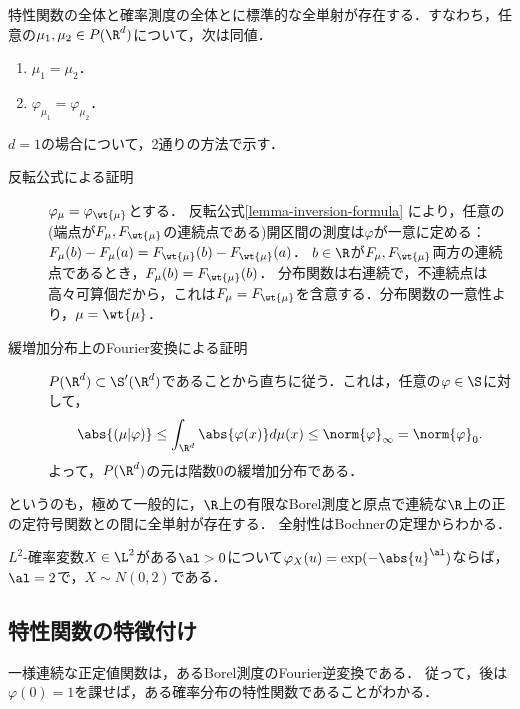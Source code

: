 \documentclass[uplatex,dvipdfmx]{jsreport}
\begin{document}
\begin{theorem}[一意性定理]
    特性関数の全体と確率測度の全体とに標準的な全単射が存在する．すなわち，任意の$\mu_1,\mu_2\in P(\R^d)$について，次は同値．
    \begin{enumerate}
        \item $\mu_1=\mu_2$．
        \item $\varphi_{\mu_1}=\varphi_{\mu_2}$．
    \end{enumerate}
\end{theorem}
\begin{Proof}
    $d=1$の場合について，2通りの方法で示す．
    \begin{description}
        \item[反転公式による証明] 
        $\varphi_\mu=\varphi_{\wt{\mu}}$とする．
        反転公式\ref{lemma-inversion-formula}
        により，任意の(端点が$F_\mu,F_{\wt{\mu}}$の連続点である)開区間の測度は$\varphi$が一意に定める：$F_\mu(b)-F_\mu(a)=F_{\wt{\mu}}(b)-F_{\wt{\mu}}(a)$．
        $b\in\R$が$F_\mu,F_{\wt{\mu}}$両方の連続点であるとき，$F_\mu(b)=F_{\wt{\mu}}(b)$．
        分布関数は右連続で，不連続点は高々可算個だから，これは$F_\mu=F_{\wt{\mu}}$を含意する．分布関数の一意性より，$\mu=\wt{\mu}$．
        \item[緩増加分布上のFourier変換による証明]
        $P(\R^d)\subset\S'(\R^d)$であることから直ちに従う．これは，任意の$\varphi\in\S$に対して，
        \[\abs{(\mu|\varphi)}\le\int_{\R^d}\abs{\varphi(x)}d\mu(x)\le\norm{\varphi}_\infty=\norm{\varphi}_0.\]
        よって，$P(\R^d)$の元は階数$0$の緩増加分布である．
    \end{description}
\end{Proof}
\begin{remarks}
    というのも，極めて一般的に，$\R$上の有限なBorel測度と原点で連続な$\R$上の正の定符号関数との間に全単射が存在する．
    全射性はBochnerの定理からわかる．
\end{remarks}

\begin{corollary}
    $L^2$-確率変数$X\in\L^2$がある$\al>0$について$\varphi_X(u)=\exp(-\abs{u}^\al)$ならば，$\al=2$で，$X\sim N(0,2)$である．
\end{corollary}

\subsection{特性関数の特徴付け}

\begin{tcolorbox}[colframe=ForestGreen, colback=ForestGreen!10!white,breakable,colbacktitle=ForestGreen!40!white,coltitle=black,fonttitle=\bfseries\sffamily,
title=]
    一様連続な正定値関数は，あるBorel測度のFourier逆変換である．
    従って，後は$\varphi(0)=1$を課せば，ある確率分布の特性関数であることがわかる．
\end{tcolorbox}
\end{document}
